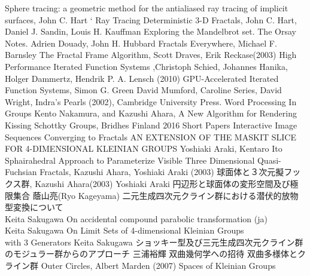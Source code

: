 {
\setlength{\baselineskip}{13pt}
\begin{thebibliography}{99}

        Sphere tracing: a geometric method for the antialiased ray tracing of implicit surfaces, John C. Hart
`
         Ray Tracing Deterministic 3-D Fractals,
         John C. Hart, Daniel J. Sandin, Louis H. Kauffman
         Exploring the Mandelbrot set. The Orsay Notes.
         Adrien Douady, John H. Hubbard
         Fractals Everywhere, Michael F. Barnsley
        The Fractal Frame Algorithm, Scott Draves, Erik Reckase(2003)
         High Performance Iterated Function Systems
         ,Christoph Schied, Johannes Hanika, Holger Dammertz, Hendrik P. A. Lensch (2010)
         GPU-Accelerated Iterated Function Systems,
         Simon G. Green
         David Mumford, Caroline Series, David Wright, Indra's Pearls
         (2002), Cambridge University Press.
         Word Processing In Groups
         Kento Nakamura, and Kazushi Ahara, A New Algorithm for
         Rendering Kissing Schottky Groups,
         Bridhes Finland 2016 Short Papers
        Interactive Image Sequences Converging to Fractals
        AN EXTENSION OF THE MASKIT SLICE FOR 4-DIMENSIONAL KLEINIAN GROUPS
        Yoshiaki Araki, Kentaro Ito
        Sphairahedral Approach to Parameterize Visible Three Dimensional Quasi-Fuchsian Fractals,
        Kazushi Ahara, Yoshiaki Araki (2003)
        球面体と３次元擬フックス群,
        Kazushi Ahara(2003)
        Yoshiaki Araki
        円辺形と球面体の変形空間及び極限集合
        蔭山亮(Ryo Kageyama)
        二元生成四次元クライン群における潜伏的放物型変換について\\
        Keita Sakugawa
        On accidental compound parabolic transformation (ja)\\
        Keita Sakugawa
        On Limit Sets of 4-dimensional Kleinian Groups\\
with 3 Generators
        Keita Sakugawa
        ショッキー型及び三元生成四次元クライン群のモジュラー群からのアプローチ
        三浦裕輝
        双曲幾何学への招待
        双曲多様体とクライン群
        Outer Circles, Albert Marden (2007)
        Spaces of Kleinian Groups
\end{thebibliography}
}